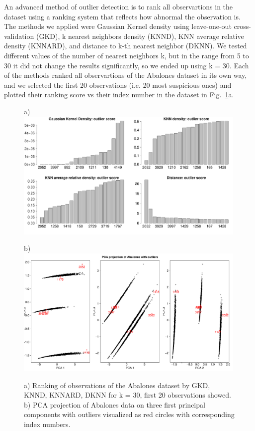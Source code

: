 \documentclass[10pt, paper=a4]{article}
\begin{document}
An advanced method of outlier detection is to rank all observartions in the
dataset using a ranking system that reflects how abnormal the observation is.
The methods we applied were Gaussian Kernel density using leave-one-out
cross-validation (GKD), k nearest neighbors density (KNND), KNN average relative
density (KNNARD), and distance to k-th nearest neighbor (DKNN).  We tested
different values of the number of nearest neighbors k, but in the range from 5
to 30 it did not change the results significantly, so we ended up using k = 30.
Each of the methods ranked all observartions of the Abalones dataset in its own
way, and we selected the first 20 observations (i.e. 20 most suspicious ones)
and plotted their ranking score vs their index number in the dataset in
Fig.~\ref{fig:data_ranking}a.

\begin{figure}[h!]
  \begin{minipage}{0.99\textwidth}
    a)\\
    \includegraphics[width = 0.99\textwidth]{data_ranking.pdf}
  \end{minipage} \vfill
  \begin{minipage}{0.99\textwidth}
    b)\\
    \includegraphics[width = 0.99\textwidth]{data_outliers.pdf}
  \end{minipage} \vfill
  \caption{a) Ranking of observations of the Abalones dataset by GKD, KNND,
    KNNARD, DKNN for k = 30, first 20 observations showed.  b) PCA projection of
    Abalones data on three first principal components with outliers visualized
    as red circles with corresponding index numbers.}
  \label{fig:data_ranking}
\end{figure}
\end{document}
